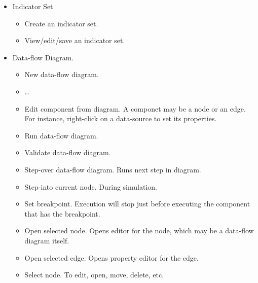 \documentclass[titlepage]{article}
\begin{document}
\begin{itemize}
  \item Indicator Set 
  \begin{itemize}
	  \item Create an indicator set.
	  \item View/edit/save an indicator set.
  \end{itemize}
  
  \item Data-flow Diagram.  
  \begin{itemize}
    \item New data-flow diagram.
    \item \ldots
    \item Edit component from diagram.  A componet may be a node or an edge.  For instance, right-click on a data-source to set its properties.
    \item Run data-flow diagram.  
    \item Validate data-flow diagram.
    \item Step-over data-flow diagram.  Runs next step in diagram.
    \item Step-into current node.  During simulation.
    \item Set breakpoint.  Execution will stop just before executing the component that has the breakpoint.
    \item Open selected node.  Opens editor for the node, which may be a data-flow diagram itself.
    \item Open selected edge.  Opens property editor for the edge.
    \item Select node.  To edit, open, move, delete, etc.
  \end{itemize}
\end{itemize}
\end{document}
